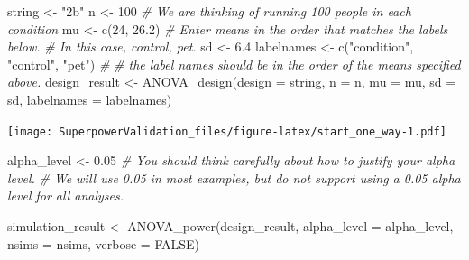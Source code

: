 \documentclass[
]{book}
\newenvironment{Shaded}{\begin{snugshade}}{\end{snugshade}}
\newcommand{\AttributeTok}[1]{\textcolor[rgb]{0.77,0.63,0.00}{#1}}
\newcommand{\CommentTok}[1]{\textcolor[rgb]{0.56,0.35,0.01}{\textit{#1}}}
\newcommand{\ConstantTok}[1]{\textcolor[rgb]{0.00,0.00,0.00}{#1}}
\newcommand{\DecValTok}[1]{\textcolor[rgb]{0.00,0.00,0.81}{#1}}
\newcommand{\FloatTok}[1]{\textcolor[rgb]{0.00,0.00,0.81}{#1}}
\newcommand{\FunctionTok}[1]{\textcolor[rgb]{0.00,0.00,0.00}{#1}}
\newcommand{\NormalTok}[1]{#1}
\newcommand{\OtherTok}[1]{\textcolor[rgb]{0.56,0.35,0.01}{#1}}
\newcommand{\StringTok}[1]{\textcolor[rgb]{0.31,0.60,0.02}{#1}}
\begin{document}
\begin{Shaded}
\begin{Highlighting}[]
\NormalTok{string }\OtherTok{\textless{}{-}} \StringTok{"2b"}
\NormalTok{n }\OtherTok{\textless{}{-}} \DecValTok{100}
\CommentTok{\# We are thinking of running 100 people in each condition}
\NormalTok{mu }\OtherTok{\textless{}{-}} \FunctionTok{c}\NormalTok{(}\DecValTok{24}\NormalTok{, }\FloatTok{26.2}\NormalTok{)}
\CommentTok{\# Enter means in the order that matches the labels below.}
\CommentTok{\# In this case, control, pet.}
\NormalTok{sd }\OtherTok{\textless{}{-}} \FloatTok{6.4}
\NormalTok{labelnames }\OtherTok{\textless{}{-}} \FunctionTok{c}\NormalTok{(}\StringTok{"condition"}\NormalTok{, }\StringTok{"control"}\NormalTok{, }\StringTok{"pet"}\NormalTok{) }\CommentTok{\#}
\CommentTok{\# the label names should be in the order of the means specified above.}
\NormalTok{design\_result }\OtherTok{\textless{}{-}} \FunctionTok{ANOVA\_design}\NormalTok{(}\AttributeTok{design =}\NormalTok{ string,}
                   \AttributeTok{n =}\NormalTok{ n,}
                   \AttributeTok{mu =}\NormalTok{ mu,}
                   \AttributeTok{sd =}\NormalTok{ sd,}
                   \AttributeTok{labelnames =}\NormalTok{ labelnames)}
\end{Highlighting}
\end{Shaded}

\texttt{[image: SuperpowerValidation\_files/figure-latex/start\_one\_way-1.pdf]}

\begin{Shaded}
\begin{Highlighting}[]
\NormalTok{alpha\_level }\OtherTok{\textless{}{-}} \FloatTok{0.05}
\CommentTok{\# You should think carefully about how to justify your alpha level.}
\CommentTok{\# We will use 0.05 in most examples, but do not support using a 0.05 alpha level for all analyses.}
\end{Highlighting}
\end{Shaded}

\begin{Shaded}
\begin{Highlighting}[]
\NormalTok{simulation\_result }\OtherTok{\textless{}{-}} \FunctionTok{ANOVA\_power}\NormalTok{(design\_result,}
                                 \AttributeTok{alpha\_level =}\NormalTok{ alpha\_level,}
                                 \AttributeTok{nsims =}\NormalTok{ nsims,}
                                 \AttributeTok{verbose =} \ConstantTok{FALSE}\NormalTok{)}
\end{Highlighting}
\end{Shaded}
\end{document}
